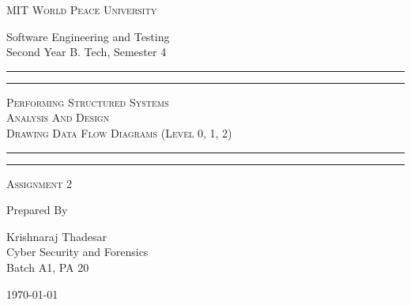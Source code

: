 \documentclass[11pt]{article}
\begin{document}
\begin{titlepage}
	\centering


	\huge\textsc{
		MIT World Peace University
	}\\

	\vspace{0.75\baselineskip} %

	\LARGE{
		Software Engineering and Testing\\
		Second Year B. Tech, Semester 4
	}

	\vfill %


	\rule{\textwidth}{1.6pt}\vspace*{-\baselineskip}\vspace*{2pt}
	\rule{\textwidth}{0.6pt}
	\vspace{0.75\baselineskip} %



	\huge{\textsc{
			Performing Structured Systems\\ Analysis And Design \\
			Drawing Data Flow Diagrams (Level 0, 1, 2)
		}} \\



	\vspace{0.5\baselineskip} %
	\rule{\textwidth}{0.6pt}\vspace*{-\baselineskip}\vspace*{2.8pt}
	\rule{\textwidth}{1.6pt}

	\vspace{1\baselineskip} %


	\LARGE\textsc{
		Assignment 2
	} %
	\vfill


	Prepared By
	\vspace{0.5\baselineskip} %

	\Large{
		Krishnaraj Thadesar \\
		Cyber Security and Forensics\\
		Batch A1, PA 20
	}


	\vspace{0.5\baselineskip} %
	\today

\end{titlepage}
\end{document}
